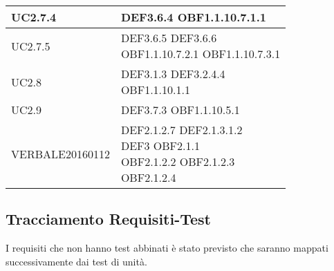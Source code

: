 \documentclass{scalatekids-article}
\begin{document}
\begin{longtable}[H]{|p{5.5cm}|p{5.5cm}|}
  \hline
  UC2.7.4 & \multiLineCell[t]{DEF3.6.4 OBF1.1.10.7.1.1\\}\\
  \hline
  UC2.7.5 & \multiLineCell[t]{DEF3.6.5 DEF3.6.6\\OBF1.1.10.7.2.1 OBF1.1.10.7.3.1\\}\\
  \hline
  UC2.8 & \multiLineCell[t]{DEF3.1.3 DEF3.2.4.4\\OBF1.1.10.1.1\\}\\
  \hline
  UC2.9 & \multiLineCell[t]{DEF3.7.3 OBF1.1.10.5.1\\}\\
  \hline
  VERBALE20160112 & \multiLineCell[t]{DEF2.1.2.7 DEF2.1.3.1.2\\DEF3 OBF2.1.1\\OBF2.1.2.2 OBF2.1.2.3\\OBF2.1.2.4}\\
  \hline
\end{longtable}







\subsection{Tracciamento Requisiti-Test}

I requisiti che non hanno test abbinati è stato previsto che
saranno mappati successivamente dai test di unità.
\end{document}
